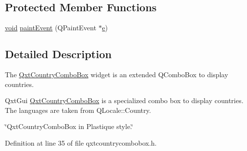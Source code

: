 \subsection*{Protected Member Functions}
\begin{DoxyCompactItemize}
\item 
\hyperlink{group___u_a_v_objects_plugin_ga444cf2ff3f0ecbe028adce838d373f5c}{void} \hyperlink{class_qxt_country_combo_box_a27cc004c043daee079d22d19e3646de9}{paint\-Event} (Q\-Paint\-Event $\ast$\hyperlink{_o_p_plots_8m_a9425be9aab51621e317ba7ade564b570}{e})
\end{DoxyCompactItemize}


\subsection{Detailed Description}
The \hyperlink{class_qxt_country_combo_box}{Qxt\-Country\-Combo\-Box} widget is an extended Q\-Combo\-Box to display countries. 

Qxt\-Gui \hyperlink{class_qxt_country_combo_box}{Qxt\-Country\-Combo\-Box} is a specialized combo box to display countries. The languages are taken from Q\-Locale\-::\-Country.

\char`\"{}\-Qxt\-Country\-Combo\-Box in Plastique style.\char`\"{} 

Definition at line 35 of file qxtcountrycombobox.\-h.




